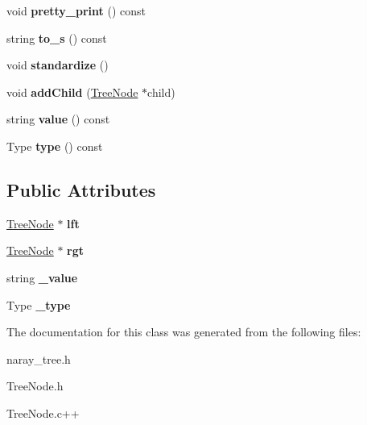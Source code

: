\begin{DoxyCompactItemize}
\item 
\hypertarget{classTreeNode_ac3d75e2ad11af5d1f4cc4cb30894fd8e}{
void {\bfseries pretty\_\-print} () const }
\label{classTreeNode_ac3d75e2ad11af5d1f4cc4cb30894fd8e}

\item 
\hypertarget{classTreeNode_adae5bb915edb3473cf0972d68f3295f6}{
string {\bfseries to\_\-s} () const }
\label{classTreeNode_adae5bb915edb3473cf0972d68f3295f6}

\item 
\hypertarget{classTreeNode_a27260fe76abb7e1020b5bfa1dfdf4009}{
void {\bfseries standardize} ()}
\label{classTreeNode_a27260fe76abb7e1020b5bfa1dfdf4009}

\item 
\hypertarget{classTreeNode_a6b1c9937781afd0acae55b610a5c327c}{
void {\bfseries addChild} (\hyperlink{classTreeNode}{TreeNode} $\ast$child)}
\label{classTreeNode_a6b1c9937781afd0acae55b610a5c327c}

\item 
\hypertarget{classTreeNode_ac14a2db6f68bd12c20f6db07ade38ef6}{
string {\bfseries value} () const }
\label{classTreeNode_ac14a2db6f68bd12c20f6db07ade38ef6}

\item 
\hypertarget{classTreeNode_a3500836ee05fdd85cd8da6958bc6fbca}{
Type {\bfseries type} () const }
\label{classTreeNode_a3500836ee05fdd85cd8da6958bc6fbca}

\end{DoxyCompactItemize}
\subsection*{Public Attributes}
\begin{DoxyCompactItemize}
\item 
\hypertarget{classTreeNode_ae819221ffd96ae18136f77874c675857}{
\hyperlink{classTreeNode}{TreeNode} $\ast$ {\bfseries lft}}
\label{classTreeNode_ae819221ffd96ae18136f77874c675857}

\item 
\hypertarget{classTreeNode_acc03d4e3a1778622bdd8f8d8cba44473}{
\hyperlink{classTreeNode}{TreeNode} $\ast$ {\bfseries rgt}}
\label{classTreeNode_acc03d4e3a1778622bdd8f8d8cba44473}

\item 
\hypertarget{classTreeNode_afc81c4758825acfd670fc5a1f51eb2e8}{
string {\bfseries \_\-value}}
\label{classTreeNode_afc81c4758825acfd670fc5a1f51eb2e8}

\item 
\hypertarget{classTreeNode_a7f16a3f7a36197c80e138a41a20c8d00}{
Type {\bfseries \_\-type}}
\label{classTreeNode_a7f16a3f7a36197c80e138a41a20c8d00}

\end{DoxyCompactItemize}


The documentation for this class was generated from the following files:\begin{DoxyCompactItemize}
\item 
naray\_\-tree.h\item 
TreeNode.h\item 
TreeNode.c++\end{DoxyCompactItemize}
